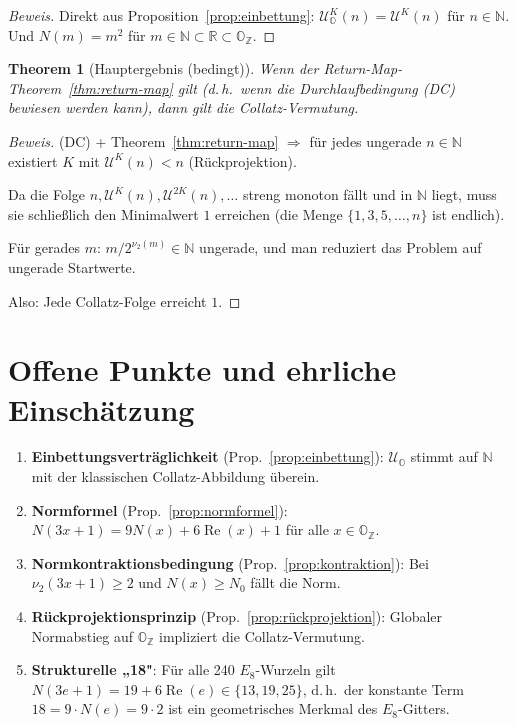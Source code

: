 \documentclass[12pt,a4paper]{article}
\newtheorem{theorem}[definition]{Theorem}
\newenvironment{beweis}{\begin{proof}[Beweis]}{\end{proof}}
\newcommand{\vii}{\nu_2}           %
\newcommand{\U}{\mathcal{U}}       %
\newcommand{\OZ}{\mathbb{O}_{\mathbb{Z}}}  %
\newcommand{\Norm}[1]{N(#1)}       %
\renewcommand{\Re}{\operatorname{Re}}
\newcommand{\N}{\mathbb{N}}
\newcommand{\R}{\mathbb{R}}
\newcommand{\Uo}{\mathcal{U}_{\mathbb{O}}} %
\begin{document}
\begin{beweis}
Direkt aus Proposition~\ref{prop:einbettung}: $\Uo^K(n) = \U^K(n)$
für $n \in \N$. Und $\Norm{m} = m^2$ für $m \in \N \subset \R \subset \OZ$.
\end{beweis}

\begin{theorem}[Hauptergebnis (bedingt)]\label{thm:haupt}
Wenn der Return-Map-Theorem~\ref{thm:return-map} gilt
\textup{(}d.\,h.\ wenn die Durchlaufbedingung \textup{(DC)} bewiesen werden kann\textup{)},
dann gilt die Collatz-Vermutung.
\end{theorem}

\begin{beweis}
(DC) + Theorem~\ref{thm:return-map} $\Rightarrow$ für jedes ungerade $n \in \N$
existiert $K$ mit $\U^K(n) < n$ (Rückprojektion).

Da die Folge $n, \U^K(n), \U^{2K}(n), \ldots$ streng monoton fällt
und in $\N$ liegt, muss sie schließlich den Minimalwert $1$ erreichen
(die Menge $\{1, 3, 5, \ldots, n\}$ ist endlich).

Für gerades $m$: $m/2^{\vii(m)} \in \N$ ungerade, und man reduziert
das Problem auf ungerade Startwerte.

Also: Jede Collatz-Folge erreicht $1$.
\end{beweis}

\section{Offene Punkte und ehrliche Einschätzung}

\begin{tcolorbox}[ergebnis, title={Was bewiesen ist}]
\begin{enumerate}[label=(\arabic*)]
  \item \textbf{Einbettungsverträglichkeit} (Prop.~\ref{prop:einbettung}):
    $\Uo$ stimmt auf $\N$ mit der klassischen Collatz-Abbildung überein.
  \item \textbf{Normformel} (Prop.~\ref{prop:normformel}):
    $\Norm{3x+1} = 9\Norm{x} + 6\Re(x) + 1$ für alle $x \in \OZ$.
  \item \textbf{Normkontraktionsbedingung} (Prop.~\ref{prop:kontraktion}):
    Bei $\vii(3x+1) \geq 2$ und $\Norm{x} \geq N_0$ fällt die Norm.
  \item \textbf{Rückprojektionsprinzip} (Prop.~\ref{prop:rückprojektion}):
    Globaler Normabstieg auf $\OZ$ impliziert die Collatz-Vermutung.
  \item \textbf{Strukturelle „18"}: Für alle 240 $E_8$-Wurzeln gilt
    $\Norm{3e+1} = 19 + 6\Re(e) \in \{13,19,25\}$,
    d.\,h.\ der konstante Term $18 = 9 \cdot \Norm{e} = 9 \cdot 2$ ist
    ein geometrisches Merkmal des $E_8$-Gitters.
\end{enumerate}
\end{tcolorbox}
\end{document}
